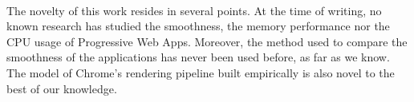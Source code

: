 \documentclass{kththesis}
\begin{document}




\paragraph{}
The novelty of this work resides in several points. At the time of writing, no known research has studied the smoothness, the memory performance nor the CPU usage of Progressive Web Apps. Moreover, the method used to compare the smoothness of the applications has never been used before, as far as we know. The model of Chrome's rendering pipeline built empirically is also novel to the best of our knowledge.
\end{document}
